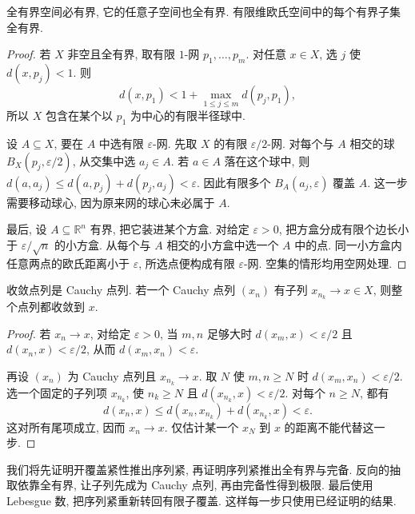 \begin{proposition}[全有界的基本性质]
\label{ch:compact:total-basic}
全有界空间必有界, 它的任意子空间也全有界. 有限维欧氏空间中的每个有界子集全有界.
\end{proposition}
\begin{proof}
若 $X$ 非空且全有界, 取有限 $1$-网 $p_1,\ldots,p_m$. 对任意 $x\in X$, 选 $j$ 使 $d(x,p_j)<1$. 则
\[
 d(x,p_1)<1+\max_{1\leq j\leq m}d(p_j,p_1),
\]
所以 $X$ 包含在某个以 $p_1$ 为中心的有限半径球中.

设 $A\subseteq X$, 要在 $A$ 中选有限 $\varepsilon$-网. 先取 $X$ 的有限 $\varepsilon/2$-网. 对每个与 $A$ 相交的球 $B_X(p_j,\varepsilon/2)$, 从交集中选 $a_j\in A$. 若 $a\in A$ 落在这个球中, 则
$d(a,a_j)\leq d(a,p_j)+d(p_j,a_j)<\varepsilon$.
因此有限多个 $B_A(a_j,\varepsilon)$ 覆盖 $A$. 这一步需要移动球心, 因为原来网的球心未必属于 $A$.

最后, 设 $A\subseteq\mathbb{R}^n$ 有界, 把它装进某个方盒. 对给定 $\varepsilon>0$, 把方盒分成有限个边长小于 $\varepsilon/\sqrt n$ 的小方盒. 从每个与 $A$ 相交的小方盒中选一个 $A$ 中的点. 同一小方盒内任意两点的欧氏距离小于 $\varepsilon$, 所选点便构成有限 $\varepsilon$-网. 空集的情形均用空网处理.
\end{proof}

\begin{lemma}
\label{ch:compact:cauchy-subsequence}
收敛点列是 Cauchy 点列. 若一个 Cauchy 点列 $(x_n)$ 有子列 $x_{n_k}\to x\in X$, 则整个点列都收敛到 $x$.
\end{lemma}
\begin{proof}
若 $x_n\to x$, 对给定 $\varepsilon>0$, 当 $m,n$ 足够大时 $d(x_m,x)<\varepsilon/2$ 且 $d(x_n,x)<\varepsilon/2$, 从而 $d(x_m,x_n)<\varepsilon$.

再设 $(x_n)$ 为 Cauchy 点列且 $x_{n_k}\to x$. 取 $N$ 使 $m,n\geq N$ 时 $d(x_m,x_n)<\varepsilon/2$. 选一个固定的子列项 $x_{n_k}$, 使 $n_k\geq N$ 且 $d(x_{n_k},x)<\varepsilon/2$. 对每个 $n\geq N$, 都有
\[
 d(x_n,x)\leq d(x_n,x_{n_k})+d(x_{n_k},x)<\varepsilon.
\]
这对所有尾项成立, 因而 $x_n\to x$. 仅估计某一个 $x_N$ 到 $x$ 的距离不能代替这一步.
\end{proof}

\label{ch:compact:equivalence-proofs}

我们将先证明开覆盖紧性推出序列紧, 再证明序列紧推出全有界与完备. 反向的抽取依靠全有界, 让子列先成为 Cauchy 点列, 再由完备性得到极限. 最后使用 Lebesgue 数, 把序列紧重新转回有限子覆盖. 这样每一步只使用已经证明的结果.

